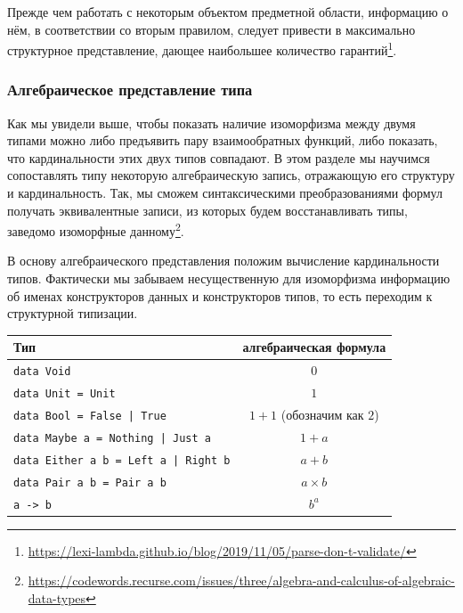 Прежде чем работать с некоторым объектом предметной области, информацию о нём, в соответствии со вторым правилом, следует привести в максимально структурное представление, дающее наибольшее количество гарантий\footnote{\url{https://lexi-lambda.github.io/blog/2019/11/05/parse-don-t-validate/}}.

\subsubsection{Алгебраическое представление типа} \label{subsubsec:type-algebra}

Как мы увидели выше, чтобы показать наличие изоморфизма между двумя типами можно либо предъявить пару взаимообратных функций, либо показать, что кардинальности этих двух типов совпадают.
В этом разделе мы научимся сопоставлять типу некоторую алгебраическую запись, отражающую его структуру и кардинальность.
Так, мы сможем синтаксическими преобразованиями формул получать эквивалентные записи, из которых будем восстанавливать типы, заведомо изоморфные данному\footnote{\url{https://codewords.recurse.com/issues/three/algebra-and-calculus-of-algebraic-data-types}}.

В основу алгебраического представления положим вычисление кардинальности типов.
Фактически мы забываем несущественную для изоморфизма информацию об именах конструкторов данных и конструкторов типов, то есть переходим к структурной типизации.
\begin{center}
    \begin{tabular}{|p{}|c|}
        \hline
        Тип                                                      & алгебраическая формула      \\
        \hline
        \texttt{data Void}                          & $0$                         \\
        \texttt{data Unit = Unit}                   & $1$                         \\
        \texttt{data Bool = False | True}           & $1 + 1$ (обозначим как $2$) \\
        \texttt{data Maybe a = Nothing | Just a}    & $1 + a$                     \\
        \texttt{data Either a b = Left a | Right b} & $a + b$                     \\
        \texttt{data Pair a b = Pair a b}           & $a \times b$                \\
        \texttt{a -> b}                             & $b^a$                       \\
        \hline
    \end{tabular}
\end{center}

